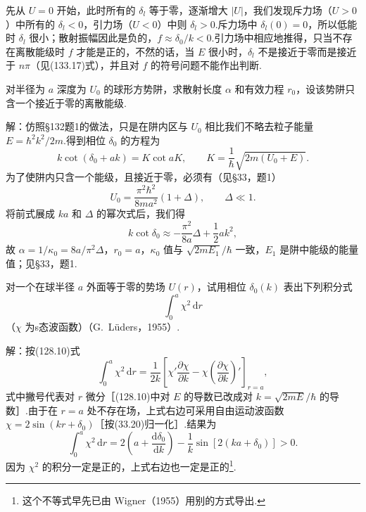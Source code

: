 \begin{xiti}
先从 $U=0$ 开始，此时所有的 $\delta_l$ 等于零，逐渐增大 $|U|$，我们发现斥力场（$U>0$）中所有的 $\delta_l<0$，引力场（$U<0$）中则 $\delta_l>0$.斥力场中 $\delta_l(0)=0$，所以低能时 $\delta_l$ 很小；散射振幅因此是负的，$f\approx\delta_0/k<0$.引力场中相应地推得，只当不存在离散能级时 $f$ 才能是正的，不然的话，当 $E$ 很小时，$\delta_l$ 不是接近于零而是接近于 $n\pi$（见(133.17)式），并且对 $f$ 的符号问题不能作出判断.

\quad 对半径为 $a$ 深度为 $U_0$ 的球形方势阱，求散射长度 $\alpha$ 和有效力程 $r_0$，设该势阱只含一个接近于零的离散能级.

解：仿照§132题1的做法，只是在阱内区与 $U_0$ 相比我们不略去粒子能量 $E=\hbar^2k^2/2m$.得到相位 $\delta_0$ 的方程为
\begin{equation*}
  k\cot(\delta_0+ak)=K\cot aK,\qquad
  K=\frac{1}{\hbar}\sqrt{2m(U_0+E)}.
\end{equation*}
为了使阱内只含一个能级，且接近于零，必须有（见§33，题1）
\begin{equation*}
  U_0=\frac{\pi^2\hbar^2}{8ma^2}(1+\Delta),
  \qquad\Delta\ll1.
\end{equation*}
将前式展成 $ka$ 和 $\Delta$ 的幂次式后，我们得
\begin{equation*}
  k\cot\delta_0\approx-\frac{\pi^2}{8a}\Delta
  +\frac{1}{2}ak^2,
\end{equation*}
故 $\alpha=1/\kappa_0=8a/\pi^2\Delta$，$r_0=a$，$\kappa_0$ 值与
$\sqrt{2mE_1}/\hbar$ 一致，$E_1$ 是阱中能级的能量值；见§33，题1.

\quad 对一个在球半径 $a$ 外面等于零的势场 $U(r)$，试用相位 $\delta_0(k)$ 表出下列积分式
\begin{equation*}
  \int_0^{a}\chi^2\,\mathrm{d}r
\end{equation*}
（$\chi$ 为s态波函数）（G.~L\"{u}ders，1955）.

解：按(128.10)式
\begin{equation*}
  \int_0^{a}\chi^2\,\mathrm{d}r
  =\frac{1}{2k}\left[\chi'\frac{\partial\chi}{\partial k}
  -\chi\left(\frac{\partial\chi}{\partial k}\right)'\right]_{r=a},
\end{equation*}
式中撇号代表对 $r$ 微分［(128.10)中对 $E$ 的导数已改成对
$k=\sqrt{2mE}/\hbar$ 的导数］.由于在 $r=a$ 处不存在场，上式右边可采用自由运动波函数 $\chi=2\sin(kr+\delta_0)$［按(33.20)归一化］.结果为
\begin{equation*}
  \int_0^{a}\chi^2\,\mathrm{d}r
  =2\left(a+\frac{\mathrm{d}\delta_0}{\mathrm{d}k}\right)
  -\frac{1}{k}\sin\left[2(ka+\delta_0)\right]>0.
\end{equation*}
因为 $\chi^2$ 的积分一定是正的，上式右边也一定是正的\footnote{这个不等式早先已由 Wigner（1955）用别的方式导出.}.

\end{xiti}

